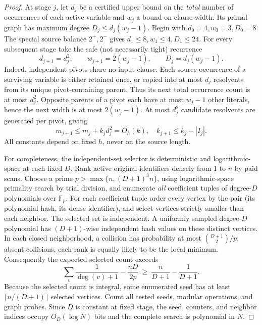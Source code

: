 \documentclass[11pt]{article}
\begin{document}
\begin{proof}
At stage \(j\), let \(d_j\) be a certified upper bound on the \emph{total} number of occurrences of each active variable and \(w_j\) a bound on clause width.  Its primal graph has maximum degree
\(D_j\le d_j(w_j-1)\).  Begin with \(d_0=4,w_0=3,D_0=8\).  The special source balance \(2^+,2^-\) gives \(d_1\le8,w_1\le4,D_1\le24\).  For every subsequent stage take the safe (not necessarily tight) recurrence
\[
 d_{j+1}=d_j^2,\qquad w_{j+1}=2(w_j-1),\qquad D_j=d_j(w_j-1).
\]
Indeed, independent pivots share no input clause.  Each source occurrence of a surviving variable is either retained once, or copied into at most \(d_j\) resolvents from its unique pivot-containing parent.  Thus its next total occurrence count is at most \(d_j^2\).  Opposite parents of a pivot each have at most \(w_j-1\) other literals, hence the next width is at most \(2(w_j-1)\).  At most \(d_j^2\) candidate resolvents are generated per pivot, giving
\[
 m_{j+1}\le m_j+k_jd_j^2=O_h(k),\quad
 k_{j+1}\le k_j-|I_j|.
\]
All constants depend on fixed \(h\), never on the source length.

For completeness, the independent-set selector is deterministic and logarithmic-space at each fixed \(D\). Rank active original identifiers densely from 1 to \(n\) by paid scans. Choose a prime \(p>\max\{n,(D+1)^3 n\}\), using logarithmic-space primality search by trial division, and enumerate \emph{all} coefficient tuples of degree-\(D\) polynomials over \(\mathbb F_p\).  For each coefficient tuple order every vertex by the pair (its polynomial hash, its dense identifier), and select vertices strictly smaller than each neighbor.  The selected set is independent.  A uniformly sampled degree-\(D\) polynomial has \((D+1)\)-wise independent hash values on these distinct vertices. In each closed neighborhood, a collision has probability at most \(\binom{D+1}{2}/p\); absent collisions, each rank is equally likely to be the local minimum. Consequently the expected selected count exceeds
\[
 \sum_v\frac1{\deg(v)+1}-\frac{nD}{2p}
 \ \ge\ \frac n{D+1}-\frac1{D+1}.
\]
Because the selected count is integral, some enumerated seed has at least \(\lceil n/(D+1)\rceil\) selected vertices. Count all tested seeds, modular operations, and graph probes. Since \(D\) is constant at fixed stage, the seed, counters, and neighbor indices occupy \(O_D(\log N)\) bits and the complete search is polynomial in \(N\).


\end{proof}
\end{document}
